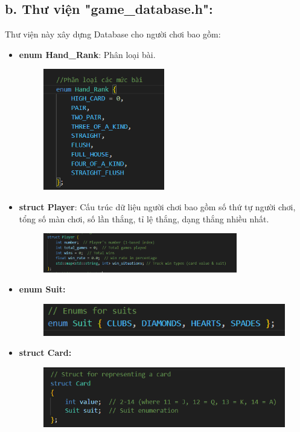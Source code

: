 \documentclass{article}
\begin{document}
\subsection{b. Thư viện "game\_database.h": }
Thư viện này xây dựng Database cho người chơi bao gồm:
\begin{itemize}
    \item \textbf{enum Hand\_Rank}: Phân loại bài.
    \begin{figure}[h!]
        \centering
        \includegraphics[width=0.5\textwidth]{images/screenshot/enum_hank_rank.png}
    \end{figure}

    \item \textbf{struct Player}: Cấu trúc dữ liệu người chơi bao gồm số thứ tự người chơi, tổng số màn chơi, số lần thắng, tỉ lệ thắng, dạng thắng nhiều nhất.
    \begin{figure}[h!]
        \centering
        \includegraphics[width=0.8\textwidth]{images/screenshot/struct_player.png}
    \end{figure}

    \item \textbf{enum Suit: }
    \begin{figure}[h!]
        \centering
        \includegraphics[width=1\textwidth]{images/screenshot/enum suit.png}
    \end{figure}    
    \item \textbf{struct Card: }
    \begin{figure}[h!]
        \centering
        \includegraphics[width=1\textwidth]{images/screenshot/struct card.png}
    \end{figure}

\end{itemize}
    
\end{document}
